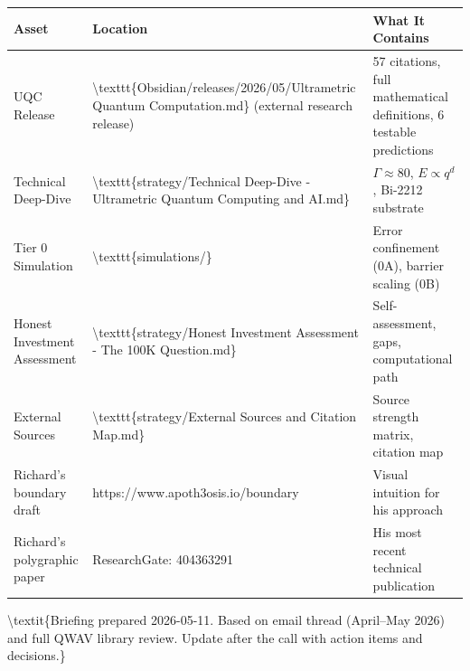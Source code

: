 \documentclass[11pt,a4paper]{article}
\begin{document}
\begin{tabular}{|l|l|l|}
\hline
\textbf{Asset} & \textbf{Location} & \textbf{What It Contains} \\
\hline
UQC Release & \textbackslash{}texttt\{Obsidian/releases/2026/05/Ultrametric Quantum Computation.md\} (external research release) & 57 citations, full mathematical definitions, 6 testable predictions \\
\hline
Technical Deep-Dive & \textbackslash{}texttt\{strategy/Technical Deep-Dive - Ultrametric Quantum Computing and AI.md\} & $\Gamma \approx 80$, $E \propto q^d$, Bi-2212 substrate \\
\hline
Tier 0 Simulation & \textbackslash{}texttt\{simulations/\} & Error confinement (0A), barrier scaling (0B) \\
\hline
Honest Investment Assessment & \textbackslash{}texttt\{strategy/Honest Investment Assessment - The 100K Question.md\} & Self-assessment, gaps, computational path \\
\hline
External Sources & \textbackslash{}texttt\{strategy/External Sources and Citation Map.md\} & Source strength matrix, citation map \\
\hline
Richard's boundary draft & https://www.apoth3osis.io/boundary & Visual intuition for his approach \\
\hline
Richard's polygraphic paper & ResearchGate: 404363291 & His most recent technical publication \\
\hline
\end{tabular}


\hrulefill


\textbackslash{}textit\{Briefing prepared 2026-05-11. Based on email thread (April--May 2026) and full QWAV library review. Update after the call with action items and decisions.\}
\end{document}
